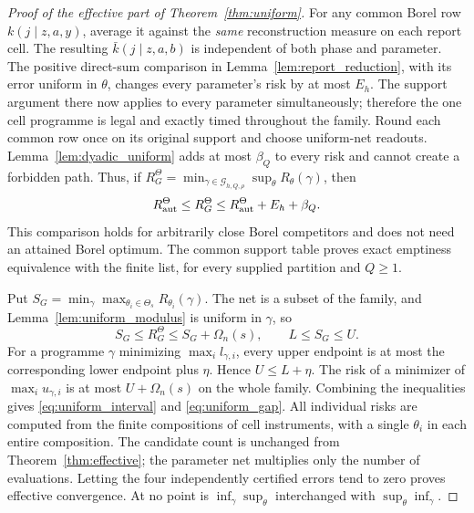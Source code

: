 \begin{proof}[Proof of the effective part of Theorem~\ref{thm:uniform}]
For any common Borel row $k(j\mid z,a,y)$, average it against the \emph{same} reconstruction measure on each report cell. The resulting $\bar k(j\mid z,a,b)$ is independent of both phase and parameter. The positive direct-sum comparison in Lemma~\ref{lem:report_reduction}, with its error uniform in $\theta$, changes every parameter's risk by at most $E_h$. The support argument there now applies to every parameter simultaneously; therefore the one cell programme is legal and exactly timed throughout the family. Round each common row once on its original support and choose uniform-net readouts. Lemma~\ref{lem:dyadic_uniform} adds at most $\beta_Q$ to every risk and cannot create a forbidden path. Thus, if
$R_G^\Theta=\min_{\gamma\in\mathscr G_{h,Q,\rho}}\sup_\theta R_\theta(\gamma)$, then
\[
 R^\Theta_{\mathrm{aut}}\le R_G^\Theta\le R^\Theta_{\mathrm{aut}}+E_h+\beta_Q.
\]
This comparison holds for arbitrarily close Borel competitors and does not need an attained Borel optimum. The common support table proves exact emptiness equivalence with the finite list, for every supplied partition and $Q\ge1$.

Put $S_G=\min_\gamma\max_{\theta_i\in\Theta_s}R_{\theta_i}(\gamma)$. The net is a subset of the family, and Lemma~\ref{lem:uniform_modulus} is uniform in $\gamma$, so
\[
 S_G\le R_G^\Theta\le S_G+\Omega_n(s),\qquad L\le S_G\le U.
\]
For a programme $\gamma$ minimizing $\max_i l_{\gamma,i}$, every upper endpoint is at most the corresponding lower endpoint plus $\eta$. Hence $U\le L+\eta$. The risk of a minimizer of $\max_i u_{\gamma,i}$ is at most $U+\Omega_n(s)$ on the whole family. Combining the inequalities gives \eqref{eq:uniform_interval} and \eqref{eq:uniform_gap}. All individual risks are computed from the finite compositions of cell instruments, with a single $\theta_i$ in each entire composition. The candidate count is unchanged from Theorem~\ref{thm:effective}; the parameter net multiplies only the number of evaluations. Letting the four independently certified errors tend to zero proves effective convergence. At no point is $\inf_\gamma\sup_\theta$ interchanged with $\sup_\theta\inf_\gamma$.
\end{proof}

